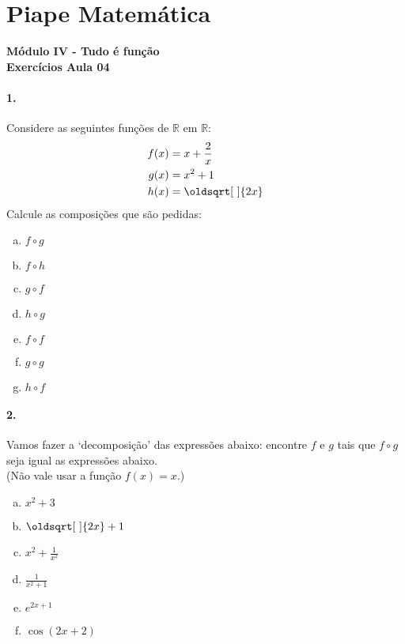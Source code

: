 \documentclass[a4paper,12pt]{article}
\renewcommand*{\sqrt}[2][\ ]{\oldsqrt[#1]{#2}}
\begin{document}
 
  
\section*{Piape Matemática} 
\textbf{Módulo IV - Tudo é função}\\
\textbf{Exercícios Aula 04}    

\begin{multicols}{2}
\paragraph*{1.} Considere as seguintes funções de $\mathbb{R}$ em $\mathbb{R}$:
\begin{align*}
f(x) &= x + \frac{2}{x}\\
g(x) &= x^2 + 1\\
h(x) &= \sqrt{2x}\\
\end{align*} 
Calcule as composições que são pedidas:
\begin{enumerate}[a)] 
    \item $f\circ g$
    \item $f\circ h$
    \item $g\circ f$
    \item $h\circ g$
    \item $f\circ f$
    \item $g\circ g$
    \item $h\circ f$
\end{enumerate}

\paragraph*{2.} Vamos fazer a `decomposição' das expressões abaixo: encontre $f$ e $g$ tais que $f\circ g$ seja igual as expressões abaixo.\\
({\footnotesize Não vale usar a função $f(x)  = x$.})
\begin{enumerate}[a)]  
    \item $x^2 + 3$
    \item $\sqrt{2x} + 1$
    \item $x^2 + \frac{1}{x^2}$
    \item $\frac{1}{x^2 + 1}$
    \item $e^{2x + 1}$
    \item $\cos(2x+2)$
\end{enumerate}

\vspace*{5cm}
\end{multicols}
\end{document}
